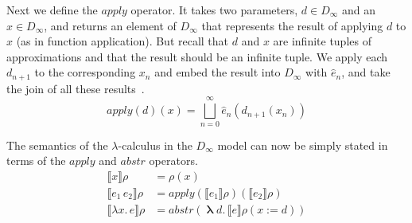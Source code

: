 \documentclass{tufte-handout}
\newcommand{\SEM}[1]{\llbracket #1 \rrbracket}
\newcommand{\LAM}[1]{\lambda #1.\,}
\newcommand{\MLAM}[1]{\boldsymbol\uplambda #1.\,}
\newcommand{\APP}[0]{\,}
\newcommand{\by}[0]{\!:=\!}
\begin{document}
Next we define the $\mathit{apply}$ operator. It takes two parameters,
$d \in D_\infty$ and an $x\in D_\infty$, and returns an element of
$D_\infty$ that represents the result of applying $d$ to $x$ (as in
function application). But recall that $d$ and $x$ are infinite tuples
of approximations and that the result should be an infinite tuple.
We apply each $d_{n+1}$ to the corresponding $x_n$ and embed the
result into $D_\infty$ with $\hat{e}_n$, and take the join of all
these results~\citep{Scott:1971aa,barendregt84:_lambda_calculus}.
\[
   \mathit{apply}(d)(x) =  \bigsqcup_{n=0}^{\infty} \hat{e}_n(d_{n+1}(x_n))
\]


The semantics of the $\lambda$-calculus in the $D_\infty$ model can
now be simply stated in terms of the $\mathit{apply}$ and
$\mathit{abstr}$ operators.
\begin{align*}
  \SEM{x}\rho &= \rho(x) \\
  \SEM{e_1 \APP e_2}\rho &= \mathit{apply}(\SEM{e_1}\rho)(\SEM{e_2}\rho) \\
  \SEM{\LAM{x} e}\rho &= \mathit{abstr}(\MLAM{d} \SEM{e}\rho(x\by d))
\end{align*}
\end{document}
